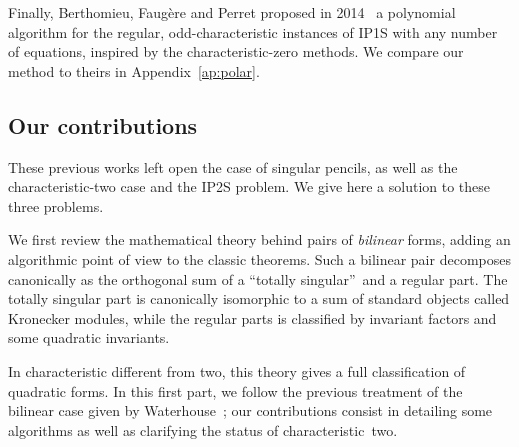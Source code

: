 \documentclass{lms}
\begin{document}
Finally, Berthomieu, Faugère and Perret
proposed in 2014~\cite{DBLP:journals/corr/BerthomieuFP13}
a polynomial algorithm for the regular, odd-characteristic instances of IP1S
with any number of equations,
inspired by the characteristic-zero methods.
We compare our method to theirs in Appendix~\ref{ap:polar}.



\subsection*{Our contributions}

These previous works left open the case of singular pencils,
as well as the characteristic-two case
and the IP2S problem.
We give here a solution to these three problems.

We first review the mathematical theory behind pairs of \emph{bilinear} forms,
adding an algorithmic point of view to the classic theorems.
% 
Such a bilinear pair decomposes canonically as the orthogonal sum of
a “totally singular” and a regular part.
The totally singular part is canonically isomorphic to a sum of
standard objects called Kronecker modules,
while the regular parts is classified by invariant factors
and some quadratic invariants.

In characteristic different from two,
this theory gives a full classification of quadratic forms.
In this first part, we follow the previous treatment of
the bilinear case given by Waterhouse~\cite{inventiones1976waterhouse};
our contributions consist in detailing some algorithms
as well as clarifying the status of characteristic~two.
\end{document}
